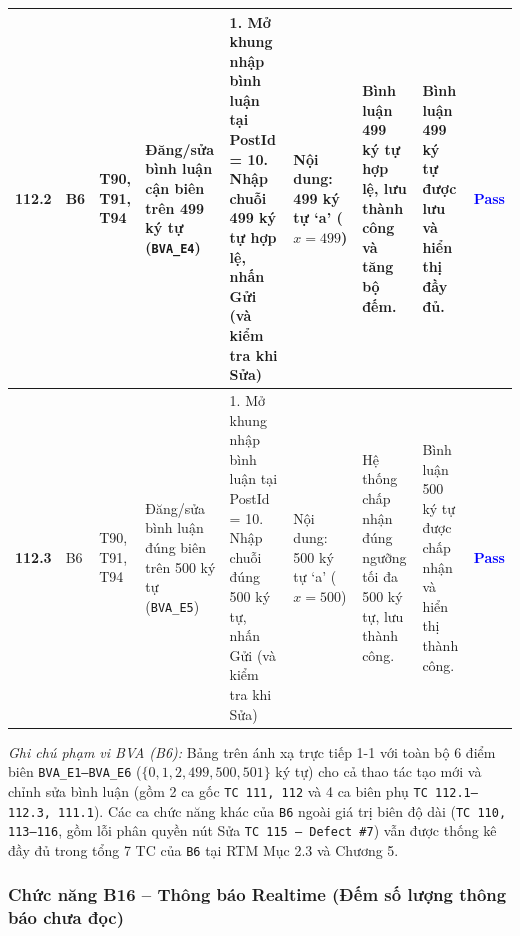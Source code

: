 \documentclass[11pt,a4paper]{article}
\begin{document}
\begin{longtable}{|C{0.9cm}|C{0.7cm}|C{0.9cm}|L{2.0cm}|L{3.0cm}|L{2.25cm}|L{2.6cm}|L{2.5cm}|C{0.85cm}|}
\textbf{112.2} & B6 & T90, T91, T94 & Đăng/sửa bình luận cận biên trên 499 ký tự (\texttt{BVA\_E4}) & 1. Mở khung nhập bình luận tại PostId = 10. Nhập chuỗi 499 ký tự hợp lệ, nhấn Gửi (và kiểm tra khi Sửa) & Nội dung: 499 ký tự `a' ($x = 499$) & Bình luận 499 ký tự hợp lệ, lưu thành công và tăng bộ đếm. & Bình luận 499 ký tự được lưu và hiển thị đầy đủ. & \textcolor{blue}{\textbf{Pass}} \\ \hline
\textbf{112.3} & B6 & T90, T91, T94 & Đăng/sửa bình luận đúng biên trên 500 ký tự (\texttt{BVA\_E5}) & 1. Mở khung nhập bình luận tại PostId = 10. Nhập chuỗi đúng 500 ký tự, nhấn Gửi (và kiểm tra khi Sửa) & Nội dung: 500 ký tự `a' ($x = 500$) & Hệ thống chấp nhận đúng ngưỡng tối đa 500 ký tự, lưu thành công. & Bình luận 500 ký tự được chấp nhận và hiển thị thành công. & \textcolor{blue}{\textbf{Pass}} \\ \hline
\end{longtable}
\endgroup

\noindent\textit{Ghi chú phạm vi BVA (B6):} Bảng trên ánh xạ trực tiếp 1-1 với toàn bộ 6 điểm biên \texttt{BVA\_E1--BVA\_E6} ($\{0, 1, 2, 499, 500, 501\}$ ký tự) cho cả thao tác tạo mới và chỉnh sửa bình luận (gồm 2 ca gốc \texttt{TC 111, 112} và 4 ca biên phụ \texttt{TC 112.1--112.3, 111.1}). Các ca chức năng khác của \texttt{B6} ngoài giá trị biên độ dài (\texttt{TC 110, 113--116}, gồm lỗi phân quyền nút Sửa \texttt{TC 115 -- Defect \#7}) vẫn được thống kê đầy đủ trong tổng 7 TC của \texttt{B6} tại RTM Mục 2.3 và Chương 5.


\subsubsection{Chức năng B16 -- Thông báo Realtime (Đếm số lượng thông báo chưa đọc)}
\end{document}
